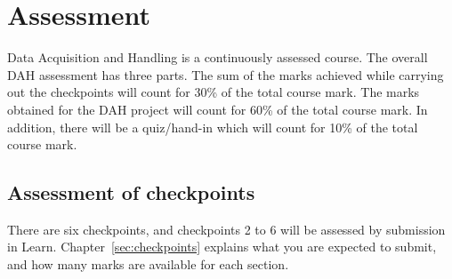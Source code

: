 \section{Assessment} 

Data Acquisition and Handling is a continuously assessed course.
The overall DAH assessment has three parts.
The sum of the marks achieved while carrying out the checkpoints will count for 30\% of the total course mark.
The marks obtained for the DAH project will count for 60\% of the total course mark.
In addition, there will be a quiz/hand-in which will count for 10\% of the total course mark.

\subsection{Assessment of checkpoints}

There are six checkpoints, and checkpoints 2 to 6 will be assessed by submission in Learn.
Chapter~\ref{sec:checkpoints} explains what you are expected to submit, and how many marks are available for each section.

